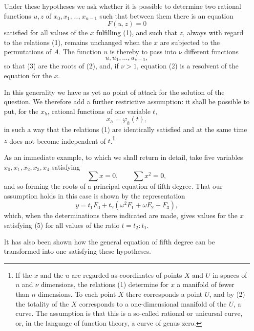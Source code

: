 \documentclass[11pt]{article}
\begin{document}
Under these hypotheses we ask whether it is possible to determine two rational functions \(u,z\) of \(x_0,x_1,\ldots,x_{n-1}\) such that between them there is an equation
\begin{equation}
F(u,z)=0
\tag{2}
\end{equation}
satisfied for all values of the \(x\) fulfilling (1), and such that \(z\), always with regard to the relations (1), remains unchanged when the \(x\) are subjected to the permutations of \(A\). The function \(u\) is thereby to pass into \(\nu\) different functions
\begin{equation}
u,u_1,\ldots,u_{\nu-1},
\tag{3}
\end{equation}
so that (3) are the roots of (2), and, if \(\nu>1\), equation (2) is a resolvent of the equation for the \(x\).

In this generality we have as yet no point of attack for the solution of the question. We therefore add a further restrictive assumption: it shall be possible to put, for the \(x_h\), rational functions of one variable \(t\),
\begin{equation}
x_h=\varphi_h(t),
\tag{4}
\end{equation}
in such a way that the relations (1) are identically satisfied and at the same time \(z\) does not become independent of \(t\).\footnote{If the \(x\) and the \(u\) are regarded as coordinates of points \(X\) and \(U\) in spaces of \(n\) and \(\nu\) dimensions, the relations (1) determine for \(x\) a manifold of fewer than \(n\) dimensions. To each point \(X\) there corresponds a point \(U\), and by (2) the totality of the \(X\) corresponds to a one-dimensional manifold of the \(U\), a curve. The assumption is that this is a so-called rational or unicursal curve, or, in the language of function theory, a curve of genus zero.}

As an immediate example, to which we shall return in detail, take five variables \(x_0,x_1,x_2,x_3,x_4\) satisfying
\begin{equation}
\sum x=0,\qquad
\sum x^2=0,
\tag{5}
\end{equation}
and so forming the roots of a principal equation of fifth degree. That our assumption holds in this case is shown by the representation
\[
y=t_1F_0+t_2(\omega^2F_1+\omega F_2+F_3),
\]
which, when the determinations there indicated are made, gives values for the \(x\) satisfying (5) for all values of the ratio \(t=t_2:t_1\).

It has also been shown how the general equation of fifth degree can be transformed into one satisfying these hypotheses.
\end{document}
